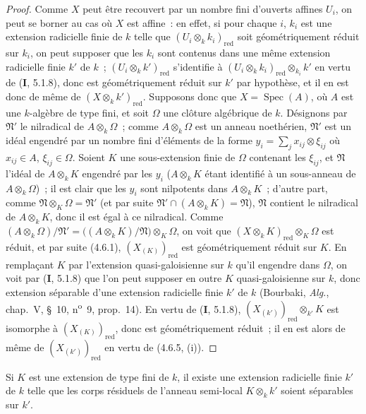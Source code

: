 \begin{proof}
Comme $X$ peut être recouvert par un nombre fini d'ouverts affines $U_i$, on
peut se borner au cas où $X$ est affine~: en effet, si pour chaque $i$, $k_i$
est une extension radicielle finie de $k$ telle que
$(U_i\otimes_k k_i)_{\mathrm{red}}$ soit géométriquement réduit sur $k_i$, on
peut supposer que les $k_i$ sont contenus dans une même extension radicielle
finie $k'$ de $k$~; $(U_i\otimes_k k')_{\mathrm{red}}$ s'identifie à
$(U_i\otimes_k k_i)_{\mathrm{red}}\otimes_{k_i}k'$
en vertu de (\textbf{I}, 5.1.8), donc est géométriquement réduit sur $k'$ par hypothèse,
et il en est donc de même de $(X\otimes_k k')_{\mathrm{red}}$. Supposons donc
que $X=\operatorname{Spec}(A)$, où $A$ est une $k$-algèbre de type fini, et
soit $\Omega$ une clôture algébrique de $k$. Désignons par $\mathfrak N'$ le
nilradical de $A\otimes_k\Omega$~; comme $A\otimes_k\Omega$ est un anneau
noethérien, $\mathfrak N'$ est un idéal engendré par un nombre fini d'éléments
de la forme
$y_i=\sum_j x_{ij}\otimes\xi_{ij}$ où $x_{ij}\in A$, $\xi_{ij}\in\Omega$.
Soient $K$ une sous-extension finie de $\Omega$ contenant les $\xi_{ij}$, et
$\mathfrak N$ l'idéal de $A\otimes_k K$ engendré par les $y_i$
($A\otimes_k K$ étant identifié à un sous-anneau de $A\otimes_k\Omega$)~; il
est clair que les $y_i$ sont nilpotents dans $A\otimes_k K$~; d'autre part,
comme $\mathfrak N\otimes_K\Omega=\mathfrak N'$ (et par suite
$\mathfrak N'\cap(A\otimes_k K)=\mathfrak N$), $\mathfrak N$ contient le
nilradical de $A\otimes_k K$, donc il est égal à ce nilradical. Comme
$(A\otimes_k\Omega)/\mathfrak N'
=\bigl((A\otimes_k K)/\mathfrak N\bigr)\otimes_K\Omega$,
on voit que $(X\otimes_k K)_{\mathrm{red}}\otimes_K\Omega$ est réduit, et par
suite (4.6.1), $(X_{(K)})_{\mathrm{red}}$ est géométriquement réduit sur $K$.
En remplaçant $K$ par l'extension quasi-galoisienne sur $k$ qu'il engendre dans
$\Omega$, on voit par (\textbf{I}, 5.1.8) que l'on peut supposer en outre $K$
quasi-galoisienne sur $k$, donc extension séparable d'une extension radicielle
finie $k'$ de $k$ (Bourbaki, \emph{Alg.}, chap.~V, \S~10,
n\textsuperscript{o}~9, prop.~14). En vertu
de (\textbf{I}, 5.1.8), $(X_{(k')})_{\mathrm{red}}\otimes_{k'}K$ est isomorphe à
$(X_{(K)})_{\mathrm{red}}$, donc est géométriquement réduit~; il en est alors de
même de $(X_{(k')})_{\mathrm{red}}$ en vertu de (4.6.5, (i)).
\end{proof}

\begin{corollary}[4.6.7]
\label{IV.2.4.6.7-fr}
Si $K$ est une extension de type fini de $k$, il existe une extension radicielle
finie $k'$ de $k$ telle que les corps résiduels de l'anneau semi-local
$K\otimes_k k'$ soient séparables sur $k'$.
\end{corollary}

